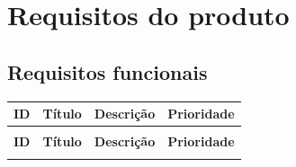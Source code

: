 \documentclass[
    12pt,
    oneside,
    a4paper,
    brazil
]{abntex2}
\begin{document}

\chapter{Requisitos do produto}

\section{Requisitos funcionais}

\begin{xltabular}{\textwidth}{>{\raggedright\arraybackslash}p{1.2cm} >{\raggedright\arraybackslash}p{2.7cm} X >{\raggedleft\arraybackslash}p{2cm}}
    \label{tab:requisitos_func} \\
    \toprule
    \textbf{ID} & \textbf{Título} & \textbf{Descrição} & \textbf{Prioridade} \\
    \midrule
    \endfirsthead

     \\
    \toprule
    \textbf{ID} & \textbf{Título} & \textbf{Descrição} & \textbf{Prioridade} \\
    \midrule
    \endhead

    \midrule
    \endfoot

    \bottomrule
    \endlastfoot


\end{xltabular}
\end{document}
